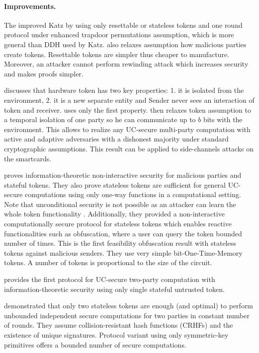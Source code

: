 \documentclass[
  digital, %
  twoside, %
  table,   %
  lof,     %
  lot,     %
]{fithesis3}
\newcommand{\cmmnt}[1]{\ignorespaces}
\theoremstyle{definition}
\theoremstyle{remark}
\begin{document}
\paragraph{Improvements.}%
The \cite{CGS08} improved Katz by using only resettable or stateless tokens and one round protocol under enhanced trapdoor permutations assumption, which is more general than DDH used by Katz. \cite{CGS08} also relaxes assumption how malicious parties create tokens\cmmnt{Attacker does not need to know the code}. Resettable tokens are simpler thus cheaper to manufacture. Moreover, an attacker cannot perform rewinding attack which increases security and makes proofs simpler.

\cite{DNW09} discusses that hardware token has two key properties: 1. it is isolated from the environment, 2. it is a new separate entity and Sender never sees an interaction of token and receiver. \cite{K07} uses only the first property. \cite{DNW09} then relaxes token assumption to a temporal isolation of one party so he can communicate up to $b$ bits with the environment. This allows to realize any UC-secure multi-party computation with active and adaptive adversaries with a dishonest majority under standard cryptographic assumptions. This result can be applied to side-channels attacks on the smartcards.

\cite{GISVW10} proves information-theoretic non-interactive security for malicious parties and stateful tokens. They also prove stateless tokens are sufficient for general UC-secure computations using only one-way functions in a computational setting. Note that unconditional security is not possible as an attacker can learn the whole token functionality \cite{GIMS10}. Additionally, they provided a non-interactive computationally secure protocol for stateless tokens which enables reactive functionalities such as obfuscation, where a user can query the token bounded number of times. This is the first feasibility obfuscation result with stateless tokens against malicious senders. They use very simple bit-One-Time-Memory tokens. A number of tokens is proportional to the size of the circuit.

\cite{DKM11} provides the first protocol for UC-secure two-party computation with information-theoretic security using only single stateful untrusted token.

\cite{CKSYZ14} demonstrated that only two stateless tokens are enough (and optimal) to perform unbounded independent secure computations for two parties in constant number of rounds.
They assume collision-resistant hash functions (CRHFs) and the existence of unique signatures. Protocol variant using only symmetric-key primitives offers a bounded number of secure computations.
\end{document}
